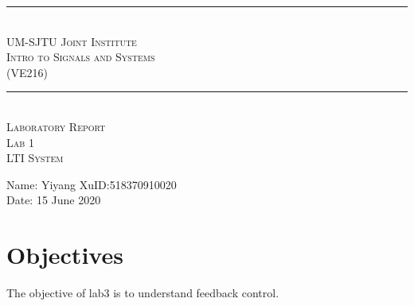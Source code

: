 \documentclass{article}
\begin{document}
\begin{center}
\vspace*{2cm}
\rule{14cm}{0.5pt}\\
\Large{\textsc{UM-SJTU Joint Institute\\
Intro to Signals and Systems\\
(VE216)\\}}
\rule{14cm}{0.5pt}\\
\vspace*{3cm}
\Large{\textsc{Laboratory Report\\
Lab 1\\
LTI System}}
\vspace*{3cm}
\end{center}
\large{Name: Yiyang Xu\qquad ID:518370910020\\
Date: 15 June 2020}
\newpage

\section{Objectives}
{
    The objective of lab3 is to understand feedback control.
}
\end{document}
